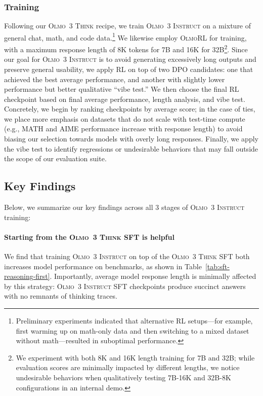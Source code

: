 \documentclass[table]{ai2style/ai2}
\newcommand{\newOlmo}{Olmo\xspace}
\newcommand{\olmothreeinstruct}{\textsc{\newOlmo~3 Instruct}\xspace}
\newcommand{\olmothreerl}{\textsc{\newOlmo{}RL}\xspace}
\newcommand{\olmothreethinking}{\textsc{Olmo~3 Think}\xspace}
\begin{document}
{{\subsubsection{Training}

Following our \olmothreethinking recipe, we train \olmothreeinstruct on a mixture of general chat, math, and code data.\footnote{Preliminary experiments indicated that alternative RL setups—for example, first warming up on math-only data and then switching to a mixed dataset without math—resulted in suboptimal performance.} We likewise employ \olmothreerl for training, with a maximum response length of 8K tokens for 7B and 16K for 32B\footnote{We experiment with both 8K and 16K length training for 7B and 32B; while evaluation scores are minimally impacted by different lengths, we notice undesirable behaviors when qualitatively testing 7B-16K and 32B-8K configurations in an internal demo.}. Since our goal for \olmothreeinstruct is to avoid generating excessively long outputs and preserve general usability, we apply RL on top of two DPO candidates: one that achieved the best average performance, and another with slightly lower performance but better qualitative “vibe test.'' We then choose the final RL checkpoint based on final average performance, length analysis, and
vibe test. Concretely, we begin by ranking checkpoints by average score; in the case of ties, we place more emphasis on datasets that do not scale with test-time compute (e.g., MATH and AIME performance increase with response length) to avoid biasing our selection towards models with overly long responses. Finally, we apply the vibe test to identify regressions or undesirable behaviors that may fall outside the scope of our evaluation suite.

\subsection{Key Findings}
\label{sec:instruct_findings}

Below, we summarize our key findings across all 3 stages of \olmothreeinstruct training:

\paragraph{Starting from the \olmothreethinking SFT is helpful} We find that training \olmothreeinstruct on top of the \olmothreethinking SFT both increases model performance on benchmarks, as shown in Table~\ref{tab:sft-reasoning-first}. 
Importantly, average model response length is minimally affected by this strategy: \olmothreeinstruct SFT checkpoints produce succinct answers with no remnants of thinking traces.

}}
\end{document}
